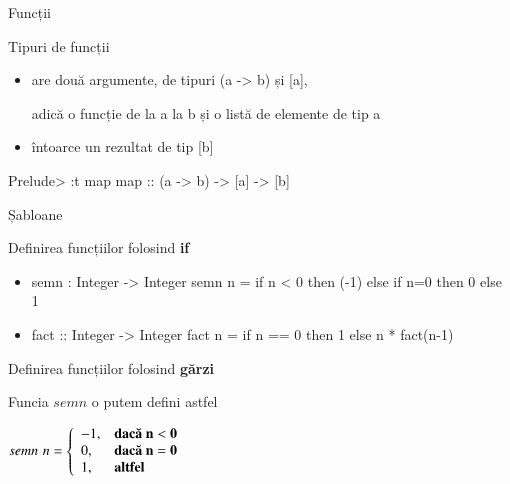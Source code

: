 \documentclass[xcolor=pdftex,romanian,colorlinks]{beamer}
\begin{document}
\begin{section}{Funcții}
\begin{frame}[fragile]{Tipuri de funcții}
\begin{itemize}
\item are două argumente, de tipuri (a -> b) și [a],

adică o funcție de la a la b și o listă de elemente de tip a
\item întoarce un rezultat de tip [b]
\end{itemize}
\pause
\begin{asciihs}
Prelude> :t map
map :: (a -> b) -> [a] -> [b]

\end{asciihs}
\end{frame}




\begin{subsection}{Șabloane}


\begin{frame}[fragile]{Definirea funcțiilor folosind {\bf if} }

\begin{itemize}
\item {}



\begin{asciihs}
semn : Integer -> Integer
semn n = if n < 0 then (-1)
         else if n=0 then 0
              else 1
\end{asciihs}

\item {}
\begin{asciihs}
fact :: Integer -> Integer
fact n = if n == 0 then 1
         else n * fact(n-1)
\end{asciihs}

\end{itemize}
\end{frame}

\begin{frame}[fragile]{Definirea funcțiilor folosind {\bf g\u arzi}}


Func\ts ia $semn$ o putem defini astfel

\medskip

 $semn \,\, n=\left\{\begin{array}{ll}
 -1, & \mbox{\bf dac\u a } {\bf n < 0}\\
 0, & \mbox{\bf dac\u a } {\bf n = 0}\\

 1, & \mbox{\bf altfel}
 \end{array}\right.$
 \medskip


\end{frame}
\end{subsection}
\end{section}
\end{document}
